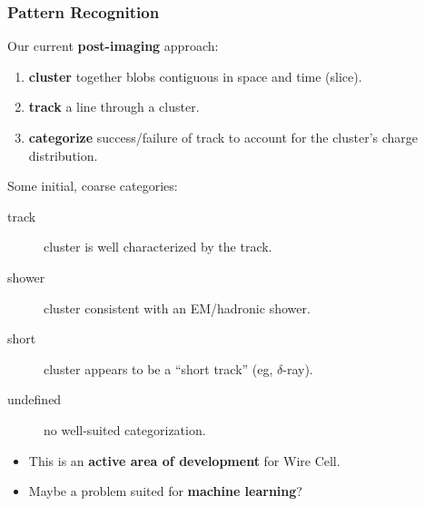 \begin{frame}
  \frametitle{Pattern Recognition}
  Our current \textbf{post-imaging} approach:
  \begin{enumerate}
  \item \textbf{cluster} together blobs contiguous in space and time
    (slice).
  \item \textbf{track} a line through a cluster.
  \item \textbf{categorize} success/failure of track to account for the
    cluster's charge distribution.
  \end{enumerate}
  Some initial, coarse categories:
  \begin{description}
  \item[track] cluster is well characterized by the track.
  \item[shower] cluster consistent with an EM/hadronic shower.
  \item[short] cluster appears to be a ``short track'' (eg, $\delta$-ray).
  \item[undefined] no well-suited categorization.
  \end{description}

  \begin{itemize}
  \item This is an \textbf{active area of development} for Wire Cell.
  \item Maybe a problem suited for \textbf{machine learning}? 
  \end{itemize}

\end{frame}
